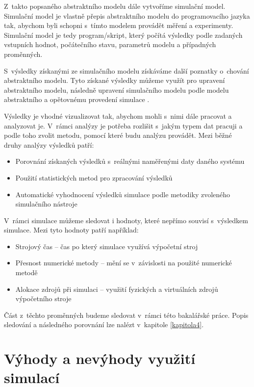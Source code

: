 Z~takto popsaného abstraktního modelu dále vytvoříme simulační model. Simulační model je vlastně přepis abstraktního modelu do programovacího jazyka tak, abychom byli schopni s~tímto modelem provádět měření a experimenty. Simulační model je tedy program/skript, který počítá výsledky podle zadaných vstupních hodnot, počátečního stavu, parametrů modelu a případných proměnných.

S~výsledky získanými ze simulačního modelu získáváme další poznatky o~chování abstraktního modelu. Tyto získané výsledky můžeme využít pro upravení abstraktního modelu, následně upravení simulačního modelu podle modelu abstraktního a opětovnému provedení simulace \cite{IMS-skripta}.

Výsledky je vhodné vizualizovat tak, abychom mohli s~nimi dále pracovat a analyzovat je. V~rámci analýzy je potřeba rozlišit s~jakým typem dat pracuji a podle toho zvolit metodu, pomocí které budu analýzu provádět. Mezi běžné druhy analýzy výsledků patří:
\begin{itemize}
    \item Porovnání získaných výsledků s~reálnými naměřenými daty daného systému
    \item Použití statistických metod pro zpracování výsledků
    \item Automatické vyhodnocení výsledků simulace podle metodiky zvoleného simulačního nástroje
\end{itemize}

V~rámci simulace můžeme sledovat i hodnoty, které nepřímo souvisí s~výsledkem simulace. Mezi tyto hodnoty patří například:
\begin{itemize}
    \item Strojový čas -- čas po který simulace využívá výpočetní stroj
    \item Přesnost numerické metody -- mění se v~závislosti na použité numerické metodě
    \item Alokace zdrojů při simulaci -- využití fyzických a virtuálních zdrojů výpočetního stroje
\end{itemize}

Část z~těchto proměnných budeme sledovat v~rámci této bakalářské práce. Popis sledování a následného porovnání lze nalézt v~kapitole \ref{kapitola4}.

\section{Výhody a nevýhody využití simulací}

